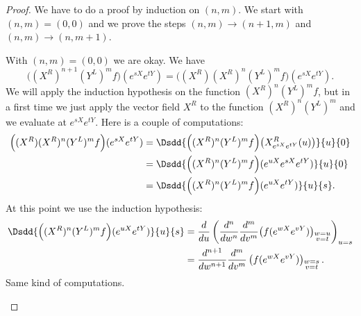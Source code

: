 \begin{proof}
	We have to do a proof by induction on \( (n,m)\). We start with \( (n,m)=(0,0)\) and we prove the steps \( (n,m)\to (n+1,m)\) and \( (n,m)\to (n,m+1)\).

	\begin{subproof}
		\spitem[\( (0,0)\)]
		With \( (n,m)=(0,0)\) we are okay.
		\spitem[\( (n+1,m)\)]
		We have
		\begin{equation}
			\Big( (X^R)^{n+1}(Y^L)^mf \Big)( e^{sX} e^{tY})=\big( (X^R)(X^R)^n(Y^L)^mf \big)( e^{sX} e^{tY}).
		\end{equation}
		We will apply the induction hypothesis on the function \( (X^R)^n(Y^L)^mf\), but in a first time we just apply the vector field \( X^R\) to the function \( (X^R)^n(Y^L)^m\) and we evaluate at \(  e^{sX} e^{tY}\). Here is a couple of computations:
		\begin{subequations}
			\begin{align}
				\Big( (X^R)(X^R)^n(Y^L)^mf \Big)( e^{sX} e^{tY}) & =\Dsdd{  \Big( (X^R)^n(Y^L)^mf \Big)\big( X^R_{ e^{sX} e^{tY}}(u) \big)  }{u}{0} \\
				                                                 & =\Dsdd{  \Big( (X^R)^n(Y^L)^mf \Big)(  e^{uX} e^{sX} e^{tY} )  }{u}{0}           \\
				                                                 & =\Dsdd{  \Big( (X^R)^n(Y^L)^mf \Big)( e^{uX} e^{tY})  }{u}{s}.
			\end{align}
		\end{subequations}
		At this point we use the induction hypothesis:
		\begin{subequations}
			\begin{align}
				\Dsdd{  \Big( (X^R)^n(Y^L)^mf \Big)( e^{uX} e^{tY})  }{u}{s} & =\frac{ d }{ du }\left( \frac{ d^n }{ dw^n }\frac{ d^m }{ dv^m }\big( f( e^{wX} e^{vY}) \big)_{\substack{w=u \\v=t}}  \right)_{u=s}\\
				                                                             & =\frac{ d^{n+1} }{ dw^{n+1} }\frac{ d^m }{ dv^m }\left( f( e^{wX} e^{vY}) \right)_{\substack{w=s             \\v=t}}.
			\end{align}
		\end{subequations}
		\spitem[\( (n,m+1)\)]
		Same kind of computations.
	\end{subproof}
\end{proof}


